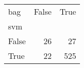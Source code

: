 \begin{tabular}{lrr}
\toprule
bag &  False &  True  \\
svm   &        &        \\
\midrule
False &     26 &     27 \\
True  &     22 &    525 \\
\bottomrule
\end{tabular}
